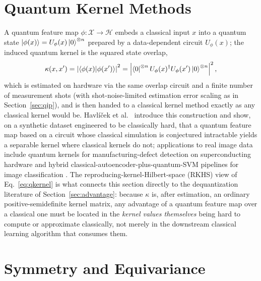 \documentclass[11pt]{article}
\begin{document}
\section{Quantum Kernel Methods}
\label{sec:kernel}
A quantum feature map $\phi:\mathcal{X}\to\mathcal{H}$ embeds a classical input $x$ into a quantum state $\ket{\phi(x)} = U_\phi(x)\ket{0}^{\otimes n}$ prepared by a data-dependent circuit $U_\phi(x)$; the induced quantum kernel is the squared state overlap,
\begin{equation}
\kappa(x,x') = \left|\braket{\phi(x)}{\phi(x')}\right|^2 = \left|\bra{0}^{\otimes n} U_\phi(x)^\dagger U_\phi(x') \ket{0}^{\otimes n}\right|^2,
\label{eq:qkernel}
\end{equation}
which is estimated on hardware via the same overlap circuit and a finite number of measurement shots (with shot-noise-limited estimation error scaling as in Section~\ref{sec:qip}), and is then handed to a classical kernel method exactly as any classical kernel would be. Havlíček et al.\ \cite{Havlicek2019} introduce this construction and show, on a synthetic dataset engineered to be classically hard, that a quantum feature map based on a circuit whose classical simulation is conjectured intractable yields a separable kernel where classical kernels do not; applications to real image data include quantum kernels for manufacturing-defect detection on superconducting hardware \cite{QuantumKernelDefect2022} and hybrid classical-autoencoder-plus-quantum-SVM pipelines for image classification \cite{Slabbert2024}. The reproducing-kernel-Hilbert-space (RKHS) view of Eq.~\eqref{eq:qkernel} is what connects this section directly to the dequantization literature of Section~\ref{sec:advantage}: because $\kappa$ is, after estimation, an ordinary positive-semidefinite kernel matrix, any advantage of a quantum feature map over a classical one must be located in the \emph{kernel values themselves} being hard to compute or approximate classically, not merely in the downstream classical learning algorithm that consumes them.

\section{Symmetry and Equivariance}
\label{sec:lr_symmetry}
\end{document}
